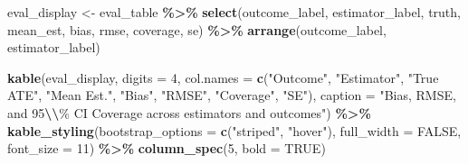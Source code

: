 \documentclass[
]{article}
\newenvironment{Shaded}{\begin{snugshade}}{\end{snugshade}}
\newcommand{\AttributeTok}[1]{\textcolor[rgb]{0.13,0.29,0.53}{#1}}
\newcommand{\ConstantTok}[1]{\textcolor[rgb]{0.56,0.35,0.01}{#1}}
\newcommand{\DecValTok}[1]{\textcolor[rgb]{0.00,0.00,0.81}{#1}}
\newcommand{\FunctionTok}[1]{\textcolor[rgb]{0.13,0.29,0.53}{\textbf{#1}}}
\newcommand{\NormalTok}[1]{#1}
\newcommand{\OtherTok}[1]{\textcolor[rgb]{0.56,0.35,0.01}{#1}}
\newcommand{\SpecialCharTok}[1]{\textcolor[rgb]{0.81,0.36,0.00}{\textbf{#1}}}
\newcommand{\StringTok}[1]{\textcolor[rgb]{0.31,0.60,0.02}{#1}}
\begin{document}
\begin{Shaded}
\begin{Highlighting}[]
\NormalTok{eval\_display }\OtherTok{\textless{}{-}}\NormalTok{ eval\_table }\SpecialCharTok{\%\textgreater{}\%}
  \FunctionTok{select}\NormalTok{(outcome\_label, estimator\_label, truth, mean\_est,}
\NormalTok{         bias, rmse, coverage, se) }\SpecialCharTok{\%\textgreater{}\%}
  \FunctionTok{arrange}\NormalTok{(outcome\_label, estimator\_label)}

\FunctionTok{kable}\NormalTok{(eval\_display, }\AttributeTok{digits =} \DecValTok{4}\NormalTok{,}
      \AttributeTok{col.names =} \FunctionTok{c}\NormalTok{(}\StringTok{"Outcome"}\NormalTok{, }\StringTok{"Estimator"}\NormalTok{, }\StringTok{"True ATE"}\NormalTok{, }\StringTok{"Mean Est."}\NormalTok{,}
                     \StringTok{"Bias"}\NormalTok{, }\StringTok{"RMSE"}\NormalTok{, }\StringTok{"Coverage"}\NormalTok{, }\StringTok{"SE"}\NormalTok{),}
      \AttributeTok{caption =} \StringTok{"Bias, RMSE, and 95}\SpecialCharTok{\textbackslash{}\textbackslash{}}\StringTok{\% CI Coverage across estimators and outcomes"}\NormalTok{) }\SpecialCharTok{\%\textgreater{}\%}
  \FunctionTok{kable\_styling}\NormalTok{(}\AttributeTok{bootstrap\_options =} \FunctionTok{c}\NormalTok{(}\StringTok{"striped"}\NormalTok{, }\StringTok{"hover"}\NormalTok{),}
                \AttributeTok{full\_width =} \ConstantTok{FALSE}\NormalTok{, }\AttributeTok{font\_size =} \DecValTok{11}\NormalTok{) }\SpecialCharTok{\%\textgreater{}\%}
  \FunctionTok{column\_spec}\NormalTok{(}\DecValTok{5}\NormalTok{, }\AttributeTok{bold =} \ConstantTok{TRUE}\NormalTok{)}
\end{Highlighting}
\end{Shaded}

\begingroup\fontsize{11}{13}\selectfont
\end{document}
